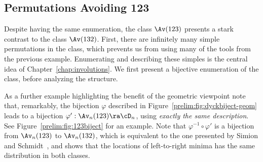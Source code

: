 \documentclass[12pt,twoside]{memoir}
\begin{document}
    \subsection{Permutations Avoiding 123}
    \label{prelim:sec:av123}

      Despite having the same enumeration, the class $\Av(123)$ presents a stark
      contrast to the class $\Av (132)$. First, there are infinitely many
      simple permutations in the class, which prevents us from using many of the
      tools from the previous example. Enumerating and describing these simples
      is the central idea of Chapter~\ref{chap:involutions}. We first present a
      bijective enumeration of the class, before analyzing the structure. 
      
      As a further example highlighting the benefit of the geometric viewpoint
      note that, remarkably, the bijection $\varphi$ described in
      Figure~\ref{prelim:fig:dyckbiject-geom} leads to a bijection
      $\varphi':\Av_n(123) \ra \cD_n$, using \emph{exactly the same description}.
      See Figure~\ref{prelim:fig:123biject} for an example. Note that
      $\varphi^{-1}
      \circ \varphi'$ is a bijection from $\Av_n (123)$ to $\Av_n (132)$, which is
      equivalent to the one presented by Simion and Schmidt~\cite{Simion1985},
      and shows that the locations of left-to-right minima has the same
      distribution in both classes. 
\end{document}
